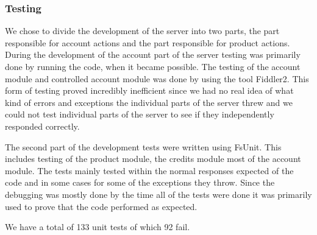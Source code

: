 \subsubsection{Testing}
We chose to divide the development of the server into two parts, the part responsible for account actions and the part responsible for product actions. During the development of the account part of the server testing was primarily done by running the code, when it became possible. The testing of the account module and controlled account module was done by using the tool Fiddler2. This form of testing proved incredibly inefficient since we had no real idea of what kind of errors and exceptions the individual parts of the server threw and we could not test individual parts of the server to see if they independently responded correctly.

The second part of the development tests were written using FsUnit. This includes testing of the product module, the credits module most of the account module. The tests mainly tested within the normal responses expected of the code and in some cases for some of the exceptions they throw. Since the debugging was mostly done by the time all of the tests were done it was primarily used to prove that the code performed as expected.

We have a total of 133 unit tests of which 92 fail.